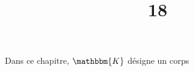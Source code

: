 \documentclass[a4paper]{report}
\title{18}{Polynômes formels}
\begin{document}
	\tableofcontents
	\vfill
	Dans ce chapitre, $\mathbbm{K}$ désigne un corps
	\vfill

	
	
\end{document}
